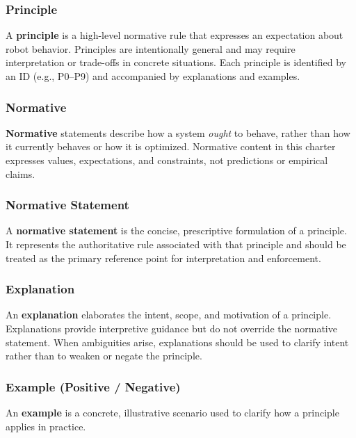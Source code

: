 \documentclass[utf8]{frontiers_suppmat} %
\begin{document}
\subsubsection{Principle}\label{principle}

A \textbf{principle} is a high-level normative rule that expresses an
expectation about robot behavior. Principles are intentionally general
and may require interpretation or trade-offs in concrete situations.
Each principle is identified by an ID (e.g., P0--P9) and accompanied by
explanations and examples.

\subsubsection{Normative}\label{normative}

\textbf{Normative} statements describe how a system \emph{ought} to
behave, rather than how it currently behaves or how it is optimized.
Normative content in this charter expresses values, expectations, and
constraints, not predictions or empirical claims.

\subsubsection{Normative Statement}\label{normative-statement-10}

A \textbf{normative statement} is the concise, prescriptive formulation
of a principle. It represents the authoritative rule associated with
that principle and should be treated as the primary reference point for
interpretation and enforcement.

\subsubsection{Explanation}\label{explanation-10}

An \textbf{explanation} elaborates the intent, scope, and motivation of
a principle. Explanations provide interpretive guidance but do not
override the normative statement. When ambiguities arise, explanations
should be used to clarify intent rather than to weaken or negate the
principle.

\subsubsection{Example (Positive /
Negative)}\label{example-positive-negative}

An \textbf{example} is a concrete, illustrative scenario used to clarify
how a principle applies in practice.
\end{document}
